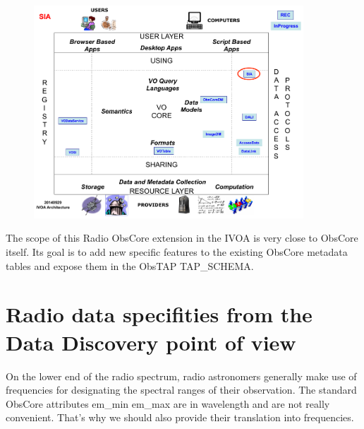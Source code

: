 \documentclass[11pt,a4paper]{ivoa}
\begin{document}


\begin{figure}[H]
\centering

\includegraphics[width=0.9\textwidth]{archdiag.png}
\label{fig:architecture}
\end{figure}


The scope of this Radio ObsCore extension in the IVOA is very close to ObsCore itself. 
Its goal is to add new specific features to the existing ObsCore metadata tables and expose 
them in the ObsTAP TAP\_SCHEMA. 





\section{Radio data specifities from the Data Discovery point of view}
\label{sec:specificities}

On the lower end of the radio spectrum, radio astronomers generally make use of 
frequencies for designating the spectral ranges of their observation. The standard 
ObsCore attributes em\_min em\_max  are in wavelength and are not really convenient. 
That's why we should also provide their translation into frequencies. 
        
\end{document}
